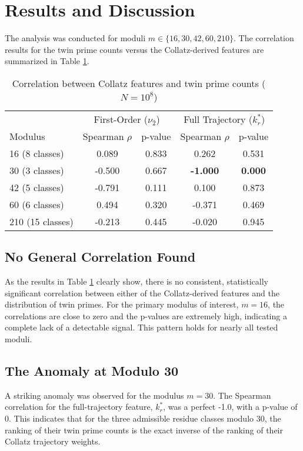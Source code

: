 \documentclass[12pt]{article}
\begin{document}
	\section{Results and Discussion}
	The analysis was conducted for moduli $m \in \{16, 30, 42, 60, 210\}$. The correlation results for the twin prime counts versus the Collatz-derived features are summarized in Table \ref{tab:correlations}.
	
	\begin{table}[h!]
		\centering
		\caption{Correlation between Collatz features and twin prime counts ($N=10^8$)}
		\label{tab:correlations}
		\begin{tabular}{@{}lcccc@{}}
			\toprule
			& \multicolumn{2}{c}{First-Order ($\nu_2$)} & \multicolumn{2}{c}{Full Trajectory ($k_r^*$)} \\
			\cmidrule(lr){2-3} \cmidrule(lr){4-5}
			Modulus & Spearman $\rho$ & p-value & Spearman $\rho$ & p-value \\
			\midrule
			16 (8 classes) & 0.089 & 0.833 & 0.262 & 0.531 \\
			30 (3 classes) & -0.500 & 0.667 & \textbf{-1.000} & \textbf{0.000} \\
			42 (5 classes) & -0.791 & 0.111 & 0.100 & 0.873 \\
			60 (6 classes) & 0.494 & 0.320 & -0.371 & 0.469 \\
			210 (15 classes) & -0.213 & 0.445 & -0.020 & 0.945 \\
			\bottomrule
		\end{tabular}
	\end{table}
	
	\subsection{No General Correlation Found}
	As the results in Table \ref{tab:correlations} clearly show, there is no consistent, statistically significant correlation between either of the Collatz-derived features and the distribution of twin primes. For the primary modulus of interest, $m=16$, the correlations are close to zero and the p-values are extremely high, indicating a complete lack of a detectable signal. This pattern holds for nearly all tested moduli.
	
	\subsection{The Anomaly at Modulo 30}
	A striking anomaly was observed for the modulus $m=30$. The Spearman correlation for the full-trajectory feature, $k_r^*$, was a perfect -1.0, with a p-value of 0. This indicates that for the three admissible residue classes modulo 30, the ranking of their twin prime counts is the exact inverse of the ranking of their Collatz trajectory weights.
	
\end{document}
